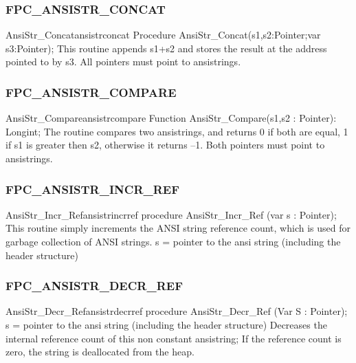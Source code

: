 \documentclass [a4paper,12pt]{article}
\begin{document}
\subsubsection{FPC{\_}ANSISTR{\_}CONCAT}
\label{subsubsec:mylabel39}

\begin{procedurel}{AnsiStr{\_}Concat}{ansistrconcat}
\Declaration
Procedure AnsiStr{\_}Concat(s1,s2:Pointer;var s3:Pointer);
\Description
This routine appends \textsf{s1}+\textsf{s2} and stores the result at the
address pointed to by \textsf{s3}.
\Notes
All pointers must point to ansistrings. 
\end{procedurel}

\subsubsection{FPC{\_}ANSISTR{\_}COMPARE}
\label{subsubsec:mylabel40}

\begin{functionl}{AnsiStr{\_}Compare}{ansistrcompare}
\Declaration
Function AnsiStr{\_}Compare(s1,s2 : Pointer): Longint;
\Description
The routine compares two ansistrings, and returns 0 if both are equal, 1 if
\textsf{s1} is greater then \textsf{s2}, otherwise it returns --1.
\Parameters
Both pointers must point to ansistrings.
\end{functionl}

\subsubsection{FPC{\_}ANSISTR{\_}INCR{\_}REF }
\label{subsubsec:mylabel41}

\begin{procedurel}{AnsiStr{\_}Incr{\_}Ref}{ansistrincrref}
\Declaration
procedure AnsiStr{\_}Incr{\_}Ref (var s : Pointer);
\Description
This routine simply increments the ANSI string reference count, which is
used for garbage collection of ANSI strings.
\Parameters
s = pointer to the ansi string (including the header structure)
\end{procedurel}

\subsubsection{FPC{\_}ANSISTR{\_}DECR{\_}REF }
\label{subsubsec:mylabel42}

\begin{procedurel}{AnsiStr{\_}Decr{\_}Ref}{ansistrdecrref}
\Declaration
procedure AnsiStr{\_}Decr{\_}Ref (Var S : Pointer);
\Parameters
s = pointer to the ansi string (including the header structure)
\Algorithm
Decreases the internal reference count of this non constant ansistring; If
the reference count is zero, the string is deallocated from the
heap.
\end{procedurel}
\end{document}
